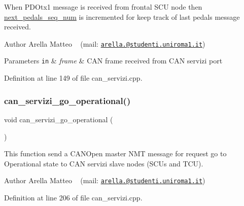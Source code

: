 When P\+D\+Otx1 message is received from frontal S\+CU node then \mbox{\hyperlink{group___c_a_n__servizi__group_gadcbd4ad67b50cf61731266bf5c5ba158}{next\+\_\+pedals\+\_\+seq\+\_\+num}} is incremented for keep track of last pedals message received.

\begin{DoxyAuthor}{Author}
Arella Matteo ~\newline
 (mail\+: \href{mailto:arella.1646983@studenti.uniroma1.it}{\tt arella.@studenti.\+uniroma1.\+it})
\end{DoxyAuthor}

\begin{DoxyParams}[1]{Parameters}
\mbox{\tt in}  & {\em frame} & C\+AN frame received from C\+AN servizi port \\
\hline
\end{DoxyParams}


Definition at line 149 of file can\+\_\+servizi.\+cpp.

\mbox{\label{group___c_a_n__servizi__group_gad444fb6be3b439dcfbefff66e85efd94}} 
\subsubsection{\texorpdfstring{can\+\_\+servizi\+\_\+go\+\_\+operational()}{can\_servizi\_go\_operational()}}
{\footnotesize\ttfamily void can\+\_\+servizi\+\_\+go\+\_\+operational (\begin{DoxyParamCaption}{ }\end{DoxyParamCaption})}



This function send a C\+A\+N\+Open master N\+MT message for request \textquotesingle{}go to Operational\textquotesingle{} state to C\+AN servizi slave nodes (S\+C\+Us and T\+CU). 

\begin{DoxyAuthor}{Author}
Arella Matteo ~\newline
 (mail\+: \href{mailto:arella.1646983@studenti.uniroma1.it}{\tt arella.@studenti.\+uniroma1.\+it}) 
\end{DoxyAuthor}


Definition at line 206 of file can\+\_\+servizi.\+cpp.


